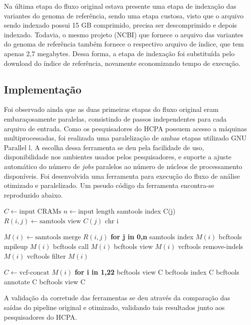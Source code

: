 \documentclass[cic,tc]{iiufrgs}
\begin{document}
{Na última etapa do fluxo original estava presente uma etapa de indexação das
variantes do genoma de referência, sendo uma etapa custosa, visto que o arquivo
sendo indexado possui 15 GB comprimido, precisa ser descomprimido e depois
indexado. Todavia, o mesmo projeto (NCBI) que fornece o arquivo das variantes
do genoma de referência também fornece o respectivo arquivo de índice, que tem
apenas 2,7 megabytes. Dessa forma, a etapa de indexação foi substituída pelo
download do índice de referência, novamente economizando tempo de execução.

\subsection{Implementação}

Foi observado ainda que as duas primeiras etapas do fluxo original eram
embaraçosamente paralelas, consistindo de passos independentes para cada
arquivo de entrada.  Como os pesquisadores do HCPA possuem acesso a máquinas
multiprocessadas, foi realizada uma paralelização de ambas etapas utilizado GNU
Parallel \cite{tange_ole_2021_5233953}l. A escolha dessa ferramenta se deu pela
facilidade de uso, disponibilidade nos ambientes usados pelos pesquisadores, e
suporte a ajuste automático do número de \textit{jobs} paralelos ao número de
núcleos de processamento disponíveis. Foi desenvolvida uma ferramenta para
execução do fluxo de análise otimizado e paralelizado. Um pseudo código da
ferramenta encontra-se reproduzido abaixo.

\begin{algorithmic}
  \State $C \gets \text{input CRAMs}$
  \State $n \gets \text{input length}$
  \State samtools index C(j)
    \State $R(i,j) \gets \text{samtools view } C(j) \text{ chr i}$
  \EndFor
\EndFor

  \State $M(i) \gets \text{samtools merge } R(i,j)$ \textbf{for j in 0,n}
  \State samtools index $M(i)$
  \State bcftools mpileup $M(i)$
  \State bcftools call $M(i)$
  \State bcftools view $M(i)$
  \State vcftools remove-indels $M(i)$
  \State vcftools filter $M(i)$
\EndFor

\State $C \gets \text{vcf-concat } M(i)$ \textbf{for i in 1,22}
\State bcftools view C
\State bcftools index C
\State bcftools annotate C
\State bcftools view C
\end{algorithmic}

A validação da corretude das ferramentas se deu através da comparação das
saídas do pipeline original e otimizado, validando tais resultados junto aos
pesquisadores do HCPA.

}
\end{document}
